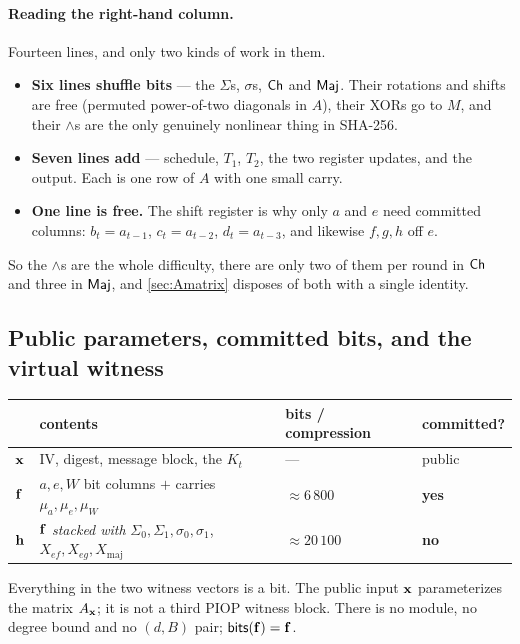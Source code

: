 \paragraph{Reading the right-hand column.}
Fourteen lines, and only two kinds of work in them.

\begin{itemize}[leftmargin=1.4em,itemsep=2pt,topsep=4pt]
  \item \textbf{Six lines shuffle bits} --- the $\Sigma$s, $\sigma$s, $\mathsf{Ch}$ and
        $\mathsf{Maj}$. Their rotations and shifts are free (permuted power-of-two
        diagonals in $A$), their XORs go to $M$, and their $\wedge$s are the only
        genuinely nonlinear thing in SHA-256.
  \item \textbf{Seven lines add} --- schedule, $T_1$, $T_2$, the two register
        updates, and the output. Each is one row of $A$ with one small carry.
  \item \textbf{One line is free.} The shift register is why only $a$ and $e$
        need committed columns: $b_t=a_{t-1}$, $c_t=a_{t-2}$, $d_t=a_{t-3}$, and
        likewise $f,g,h$ off $e$.
\end{itemize}

\noindent
So the $\wedge$s are the whole difficulty, there are only two of them per round
in $\mathsf{Ch}$ and three in $\mathsf{Maj}$, and \cref{sec:Amatrix} disposes of both with a
single identity.

\subsection{Public parameters, committed bits, and the virtual witness}

\begin{center}\small
\begin{tabular}{@{}llll@{}}
\toprule
& contents & bits / compression & committed?\\
\midrule
$\mathbf{x}$ & IV, digest, message block, the $K_t$ & --- & public\\
$\mathbf{f}$ & $a,e,W$ bit columns $+$ carries $\mu_a,\mu_e,\mu_W$
  & $\approx6\,800$ & \textbf{yes}\\
$\mathbf{h}$ & $\mathbf{f}$ \emph{stacked with} $\Sigma_0,\Sigma_1,\sigma_0,\sigma_1$,
  $X_{ef},X_{eg},X_{\mathrm{maj}}$ & $\approx20\,100$ & \textbf{no}\\
\bottomrule
\end{tabular}
\end{center}

Everything in the two witness vectors is a bit.  The public input $\mathbf{x}$
parameterizes the matrix $A_{\mathbf{x}}$; it is not a third PIOP witness block.
There is no module, no degree bound and no $(d,B)$ pair;
$\mathsf{bits}(\mathbf{f})=\mathbf{f}$.

